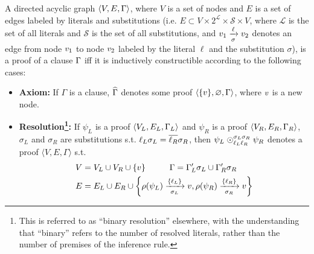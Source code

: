 \begin{definition} 
\label{def:proof}%
A directed acyclic graph $\langle V, E, \clause \rangle$, where $V$ is a set of nodes and $E$ is a
set of edges labeled by literals and substitutions (i.e. $E \subset V \times 2^{\mathcal{L}} \times \mathcal{S} \times V$, where $\mathcal{L}$ is the set of all literals and $\mathcal{S}$ is the set of all substitutions, and $\n_1
\xrightarrow[\sigma]{\ell} \n_2$ denotes an edge from node $\n_1$ to node $\n_2$ labeled by the literal $\ell$ and the substitution $\sigma$), is a
proof of a clause $\clause$ iff it is inductively constructible according to the following cases:
%
\begin{itemize}
  \item \textbf{Axiom:} If $\Gamma$ is a clause, $\axiom{\Gamma}$ denotes some proof $\langle \{ \n \}, \varnothing,
    \Gamma \rangle$, where $\n$ is a new node. %
  \item \textbf{Resolution\footnote{This is referred to as ``binary resolution'' elsewhere, with the understanding that ``binary'' refers to the number of resolved literals, rather than the number of premises of the inference rule.}:} If $\psi_L$ is a proof $\langle V_L, E_L, \clause_L \rangle$ and
    $\psi_R$ is a proof $\langle V_R, E_R, \clause_R \rangle$, $\sigma_L$ and $\sigma_R$ are substitutions s.t. $\ell_L\sigma_L=\dual{\ell_R}\sigma_R$,
    then
    $\psi_L \res{\ell_L}{\sigma_L}{\ell_R}{\sigma_R} \psi_R$ denotes a proof $\langle V, E, \Gamma \rangle$ s.t.
\begin{align*}
     V  &= V_L \cup V_R \cup \{\n \}  \hspace*{1cm}\Gamma = \clause_L' \sigma_L \cup  \clause_R' \sigma_R \\
     E &= E_L \cup E_R \cup  \left\{ \raiz{\psi_L} \xrightarrow[\sigma_L]{\{\ell_L\} } \n,   \raiz{\psi_R} \xrightarrow[\sigma_R]{\{\ell_R\} } \n \right\}
\end{align*}

\end{itemize}
\end{definition}
